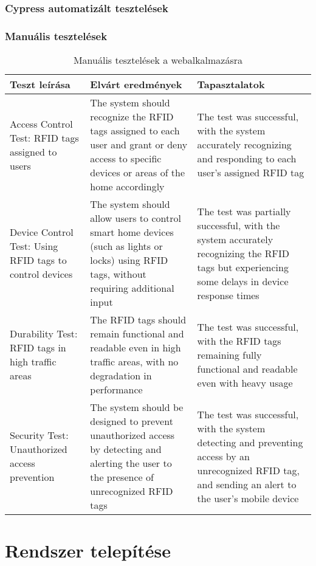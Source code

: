 \documentclass[
]{thesis-ekf}
\theoremstyle{definition}
\theoremstyle{remark}
\begin{document}
	\subsection{Cypress automatizált tesztelések}
	\subsection{Manuális tesztelések}
	\begin{table}[h]
		\centering
		\begin{tabular}{|p{6cm}|p{6cm}|p{4cm}|}
			\hline
			\textbf{Teszt leírása} & \textbf{Elvárt eredmények} & \textbf{Tapasztalatok} \\
			\hline
			Access Control Test: RFID tags assigned to users &
			 The system should recognize the RFID tags assigned to each user and grant or deny access to specific devices or areas of the home accordingly &
			  The test was successful, with the system accurately recognizing and responding to each user's assigned RFID tag \\
			\hline
			Device Control Test: Using RFID tags to control devices &
			 The system should allow users to control smart home devices (such as lights or locks) using RFID tags, without requiring additional input &
			  The test was partially successful, with the system accurately recognizing the RFID tags but experiencing some delays in device response times \\
			\hline
			Durability Test: RFID tags in high traffic areas &
			 The RFID tags should remain functional and readable even in high traffic areas, with no degradation in performance &
			  The test was successful, with the RFID tags remaining fully functional and readable even with heavy usage \\
			\hline
			Security Test: Unauthorized access prevention &
			 The system should be designed to prevent unauthorized access by detecting and alerting the user to the presence of unrecognized RFID tags & 
			 The test was successful, with the system detecting and preventing access by an unrecognized RFID tag, and sending an alert to the user's mobile device \\
			\hline
		\end{tabular}
		\caption{Manuális tesztelések a webalkalmazásra}
		\label{table:manual-testing-results}
	\end{table}
	
	\chapter{Rendszer telepítése}
\end{document}
